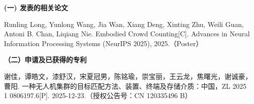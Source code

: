\begin{publication}
\noindent\textbf{(一) 发表的相关论文}
\begin{publist}
\item Runling Long, Yunlong Wang, Jia Wan, Xiang Deng, Xinting Zhu, Weili Guan, Antoni B. Chan, Liqiang Nie. Embodied Crowd Counting[C]. Advances in Neural Information Processing Systems (NeurIPS 2025), 2025.（Poster）
\end{publist}

\noindent\textbf{（二）申请及已获得的专利}
\begin{publist}
\item 谢佳，谭皓文，漆舒汉，宋夏冠男，陈铭瑜，崇宝丽，王云龙，焦曙光，谢诚豪，曹阳. 一种无人机集群的目标匹配方法、装置、终端及存储介质：中国，ZL 2025 1 0806197.6[P]. 2025-12-23.（授权公告号：CN 120335496 B）
\end{publist}
\end{publication}
